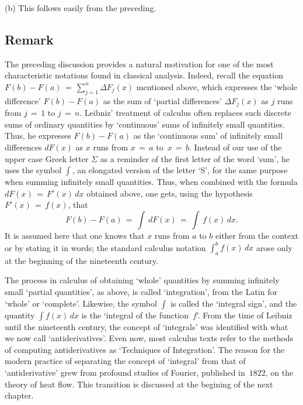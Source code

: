 \V

        (b) This follows easily from the preceding. \Q

\VV

            \subsection{\small{\bf Remark}}
            \label{RemrkE45.140}

\V

        The preceding discussion provides a natural motivation for one of the most characteristic notations found in classical analysis.
    Indeed, recall the equation $F(b)-F(a) \,=\, \sum_{j=1}^{n} {\Delta}F_{j}(x)$ mentioned above,
    which expresses the `whole difference' $F(b)-F(a)$ as the sum of `partial differences' ${\Delta}F_{j}(x)$ as $j$ runs from $j \,=\, 1$ to $j \,=\, n$. 
    Leibniz' treatment of calculus often replaces such discrete sums of ordinary quantities by `continuous' sums of infinitely small quantities.
    Thus, he expresses $F(b)-F(a)$ as the `continuous sum' of infinitely small differences $dF(x)$ as $x$ runs from $x \,=\, a$ to~$x \,=\, b$.
    Instead of our use of the upper case Greek letter $\Sigma$ as a reminder of the first letter of the word `sum',
    he uses the symbol ${\displaystyle \int}$, an elongated version of the letter `S', for the same purpose when summing infinitely small quantities.
    Thus, when combined with the formula $dF(x) \,=\, F'(x)\,dx$ obtained above, one gets, using the hypothesis $F'(x) \,=\, f(x)$, that
        \begin{displaymath}
        F(b) - F(a) \,=\, \int\,dF(x) \,=\, \int\,f(x)\,dx.
        \end{displaymath}
    It is assumed here that one knows that $x$ runs from $a$ to $b$ either from the context or by stating it in words;
    the standard calculus notation ${\displaystyle \int_{a}^{b} f(x)\,dx}$ arose only at the beginning of the nineteenth century.

        The process in calculus of obtaining `whole' quantities by summing infinitely small `partial quantities', as above,
    is called `integration', from the Latin for `whole' or `complete'. Likewise, the symbol ${\displaystyle \int}$ is called the `integral sign', and the quantity
    ${\displaystyle \int f(x)\,dx}$ is the `integral of the function~$f$'. From the time of Leibniz until the nineteenth century,
    the concept of `integrals' was identified with what we now call `antiderivatives'.
    Even now, most calculus texts refer to the methods of computing antiderivatives as `Techniques of Integration'.
    The reason for the modern practice of separating the concept of `integral' from that of `antiderivative' grew from profound studies of Fourier,
    published in~$1822$, on the theory of heat flow. This transition is discussed at the begining of the next chapter.


